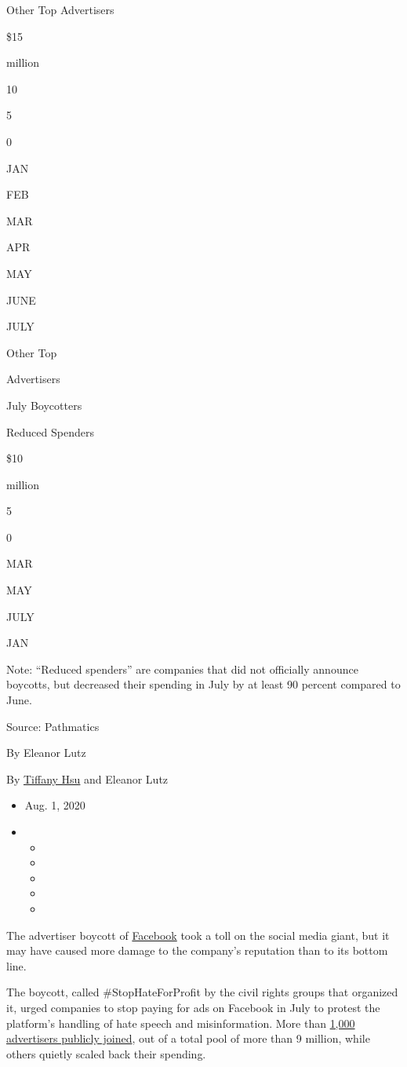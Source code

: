 Other Top Advertisers

\$15

million

10

5

0

JAN

FEB

MAR

APR

MAY

JUNE

JULY

Other Top

Advertisers

July Boycotters

Reduced Spenders

\$10

million

5

0

MAR

MAY

JULY

JAN

Note: ``Reduced spenders'' are companies that did not officially
announce boycotts, but decreased their spending in July by at least 90
percent compared to June.

Source: Pathmatics

By Eleanor Lutz

By \href{https://www.nytimes3xbfgragh.onion/by/tiffany-hsu}{Tiffany Hsu}
and Eleanor Lutz

\begin{itemize}
\item
  Aug. 1, 2020
\item
  \begin{itemize}
  \item
  \item
  \item
  \item
  \item
  \end{itemize}
\end{itemize}

The advertiser boycott of
\href{https://www.nytimes3xbfgragh.onion/2020/08/03/nyregion/facebook-nyc-office-farley-building.html}{Facebook}
took a toll on the social media giant, but it may have caused more
damage to the company's reputation than to its bottom line.

The boycott, called \#StopHateForProfit by the civil rights groups that
organized it, urged companies to stop paying for ads on Facebook in July
to protest the platform's handling of hate speech and misinformation.
More than
\href{https://www.nytimes3xbfgragh.onion/2020/06/26/business/media/Facebook-advertising-boycott.html}{1,000
advertisers publicly joined}, out of a total pool of more than 9
million, while others quietly scaled back their spending.

